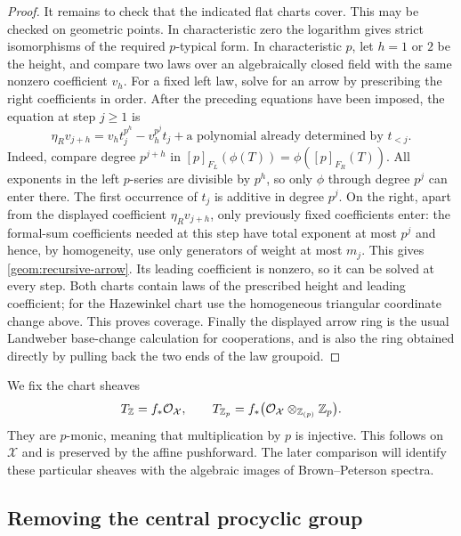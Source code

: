 \begin{proof}
It remains to check that the indicated flat charts cover.  This may
be checked on geometric points.  In characteristic zero the logarithm
gives strict isomorphisms of the required $p$-typical form.  In
characteristic $p$, let $h=1$ or $2$ be the height, and compare two
laws over an algebraically closed field with the same nonzero
coefficient $v_h$.  For a fixed left law, solve for an arrow by
prescribing the right coefficients in order.  After the preceding
equations have been imposed, the equation at step $j\geq1$ is
\begin{equation}\label{geom:recursive-arrow}
 \eta_Rv_{j+h}
 =v_h t_j^{p^h}-v_h^{p^j}t_j
       +\text{a polynomial already determined by }t_{<j}.
\end{equation}
Indeed, compare degree $p^{j+h}$ in
$[p]_{F_L}(\phi(T))=\phi([p]_{F_R}(T))$.  All exponents in the
left $p$-series are divisible by $p^h$, so only $\phi$ through degree
$p^j$ can enter there.  The first occurrence of $t_j$ is additive in
degree $p^j$.  On the right, apart from the displayed coefficient
$\eta_Rv_{j+h}$, only previously fixed coefficients enter: the
formal-sum coefficients needed at this step have total exponent at
most $p^j$ and hence, by homogeneity, use only generators of weight
at most $m_j$.  This gives \eqref{geom:recursive-arrow}.
Its leading coefficient is nonzero, so it can be solved at every
step.  Both charts contain laws of the prescribed height and leading
coefficient; for the Hazewinkel chart use the homogeneous triangular
coordinate change above.  This proves coverage.  Finally the displayed
arrow ring is the usual Landweber base-change calculation for
cooperations, and is also the ring obtained directly by pulling back
the two ends of the law groupoid.
\end{proof}

We fix the chart sheaves
\begin{equation}\label{geom:integral-chart-sheaves}
 T_{\mathbb Z}=f_*\mathcal O_{\mathcal X},\qquad
 T_{\mathbb Z_p}=f_*\bigl(\mathcal O_{\mathcal X}
                          \otimes_{\mathbb Z_{(p)}}\mathbb Z_p\bigr).
\end{equation}
They are $p$-monic, meaning that multiplication by $p$ is injective.
This follows on $\mathcal X$ and is preserved by the affine pushforward.
The later comparison will identify these particular sheaves with the
algebraic images of Brown--Peterson spectra.

\subsection{Removing the central procyclic group}

